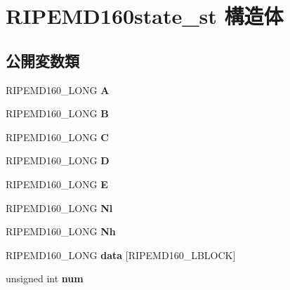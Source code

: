 \hypertarget{struct_r_i_p_e_m_d160state__st}{}\section{R\+I\+P\+E\+M\+D160state\+\_\+st 構造体}
\label{struct_r_i_p_e_m_d160state__st}
\subsection*{公開変数類}
\begin{DoxyCompactItemize}
\item 
\hypertarget{struct_r_i_p_e_m_d160state__st_aff584a2fea5f0d7e0e6417ad82b2105b}{}R\+I\+P\+E\+M\+D160\+\_\+\+L\+O\+N\+G {\bfseries A}\label{struct_r_i_p_e_m_d160state__st_aff584a2fea5f0d7e0e6417ad82b2105b}

\item 
\hypertarget{struct_r_i_p_e_m_d160state__st_a13a7eae93311ddac26f72cdc497890c0}{}R\+I\+P\+E\+M\+D160\+\_\+\+L\+O\+N\+G {\bfseries B}\label{struct_r_i_p_e_m_d160state__st_a13a7eae93311ddac26f72cdc497890c0}

\item 
\hypertarget{struct_r_i_p_e_m_d160state__st_ab2caeef80f014ab050d680953719d66d}{}R\+I\+P\+E\+M\+D160\+\_\+\+L\+O\+N\+G {\bfseries C}\label{struct_r_i_p_e_m_d160state__st_ab2caeef80f014ab050d680953719d66d}

\item 
\hypertarget{struct_r_i_p_e_m_d160state__st_afe0e351485e4bd84951f447449743567}{}R\+I\+P\+E\+M\+D160\+\_\+\+L\+O\+N\+G {\bfseries D}\label{struct_r_i_p_e_m_d160state__st_afe0e351485e4bd84951f447449743567}

\item 
\hypertarget{struct_r_i_p_e_m_d160state__st_a236f279b953d3527e5d7466554a7b807}{}R\+I\+P\+E\+M\+D160\+\_\+\+L\+O\+N\+G {\bfseries E}\label{struct_r_i_p_e_m_d160state__st_a236f279b953d3527e5d7466554a7b807}

\item 
\hypertarget{struct_r_i_p_e_m_d160state__st_a9acc9c92383f29553b952e9eef1f637e}{}R\+I\+P\+E\+M\+D160\+\_\+\+L\+O\+N\+G {\bfseries Nl}\label{struct_r_i_p_e_m_d160state__st_a9acc9c92383f29553b952e9eef1f637e}

\item 
\hypertarget{struct_r_i_p_e_m_d160state__st_ab2372dbb5687eeda765406bac59fab6b}{}R\+I\+P\+E\+M\+D160\+\_\+\+L\+O\+N\+G {\bfseries Nh}\label{struct_r_i_p_e_m_d160state__st_ab2372dbb5687eeda765406bac59fab6b}

\item 
\hypertarget{struct_r_i_p_e_m_d160state__st_a3277ac96488c067ecd4be06bcc254acc}{}R\+I\+P\+E\+M\+D160\+\_\+\+L\+O\+N\+G {\bfseries data} \mbox{[}R\+I\+P\+E\+M\+D160\+\_\+\+L\+B\+L\+O\+C\+K\mbox{]}\label{struct_r_i_p_e_m_d160state__st_a3277ac96488c067ecd4be06bcc254acc}

\item 
\hypertarget{struct_r_i_p_e_m_d160state__st_acb6e5ff004459b4b8bada376dbc87014}{}unsigned int {\bfseries num}\label{struct_r_i_p_e_m_d160state__st_acb6e5ff004459b4b8bada376dbc87014}

\end{DoxyCompactItemize}


